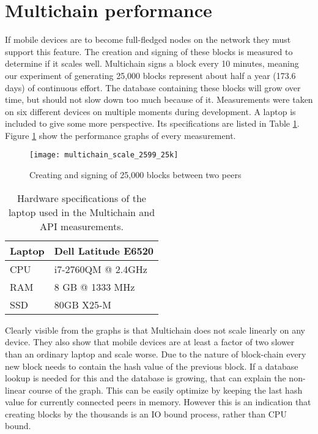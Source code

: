 \section{Multichain performance}\label{sec:multichain_perf}
If mobile devices are to become full-fledged nodes on the network they must support this feature.
The creation and signing of these blocks is measured to determine if it scales well.
Multichain signs a block every 10 minutes, meaning our experiment of generating 25,000 blocks represent about half a year (173.6 days) of continuous effort.
The database containing these blocks will grow over time, but should not slow down too much because of it.
Measurements were taken on six different devices on multiple moments during development.
A laptop is included to give some more perspective.
Its specifications are listed in Table \ref{table:specs_laptop}.
Figure \ref{fig:multichain_25} show the performance graphs of every measurement.
\begin{figure}[H]
	\centering
	\texttt{[image: multichain\_scale\_2599\_25k]}
	\caption{Creating and signing of 25,000 blocks between two peers}
	\label{fig:multichain_25}
\end{figure}
\begin{table}[H]
	\begin{tabular}{l | l} \hline
		Laptop & Dell Latitude E6520 \\ \hline \hline
		CPU & i7-2760QM @ 2.4GHz \\ \hline
		RAM & 8 GB @ 1333 MHz \\ \hline %
		SSD & 80GB X25-M \\ \hline %
	\end{tabular}
	\caption{Hardware specifications of the laptop used in the Multichain and API measurements.}
	\label{table:specs_laptop}
\end{table}
Clearly visible from the graphs is that Multichain does not scale linearly on any device.
They also show that mobile devices are at least a factor of two slower than an ordinary laptop and scale worse.
Due to the nature of block-chain every new block needs to contain the hash value of the previous block.
If a database lookup is needed for this and the database is growing, that can explain the non-linear course of the graph.
This can be easily optimize by keeping the last hash value for currently connected peers in memory.
However this is an indication that creating blocks by the thousands is an IO bound process, rather than CPU bound.

